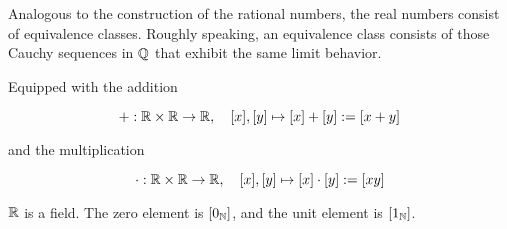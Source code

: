 Analogous to the construction of the rational numbers, the real numbers consist of equivalence classes.
Roughly speaking, an equivalence class consists of those Cauchy sequences in \( \mathbb{Q} \) that exhibit 
the same limit behavior.

Equipped with the addition

\[
	+ : \mathbb{R} \times \mathbb{R} \to \mathbb{R}, \quad [x], [y] \mapsto [x] + [y] := [x + y]
\]

and the multiplication

\[
	\cdot : \mathbb{R} \times \mathbb{R} \to \mathbb{R}, \quad [x], [y] \mapsto [x] \cdot [y] := [xy]
\]

\( \mathbb{R} \) is a field. The zero element is \( [0_{\mathbb{N}}] \), and the unit element is 
\( [1_{\mathbb{N}}] \).

